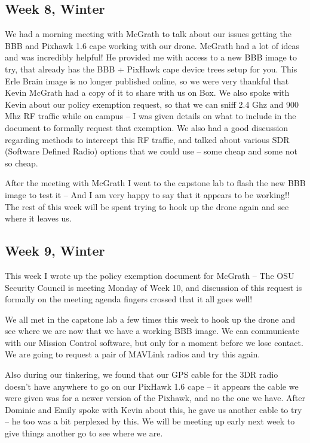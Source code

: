 \documentclass[IEEEtran,letterpaper,10pt,notitlepage,draftclsnofoot,onecolumn]{article}
\begin{document}
\subsection{Week 8, Winter}
We had a morning meeting with McGrath to talk about our issues getting the BBB and Pixhawk 1.6 cape working with our drone. McGrath had a lot of ideas and was incredibly helpful! He provided me with access to a new BBB image to try, that already has the BBB + PixHawk cape device trees setup for you. This Erle Brain image is no longer published online, so we were very thankful that Kevin McGrath had a copy of it to share with us on Box. We also spoke with Kevin about our policy exemption request, so that we can sniff 2.4 Ghz and 900 Mhz RF traffic while on campus -- I was given details on what to include in the document to formally request that exemption. We also had a good discussion regarding methods to intercept this RF traffic, and talked about various SDR (Software Defined Radio) options that we could use -- some cheap and some not so cheap.

After the meeting with McGrath I went to the capstone lab to flash the new BBB image to test it -- And I am very happy to say that it appears to be working!! The rest of this week will be spent trying to hook up the drone again and see where it leaves us.
\subsection{Week 9, Winter}
This week I wrote up the policy exemption document for McGrath -- The OSU Security Council is meeting Monday of Week 10, and discussion of this request is formally on the meeting agenda fingers crossed that it all goes well!

We all met in the capstone lab a few times this week to hook up the drone and see where we are now that we have a working BBB image. We can communicate with our Mission Control software, but only for a moment before we lose contact. We are going to request a pair of MAVLink radios and try this again.

Also during our tinkering, we found that our GPS cable for the 3DR radio doesn't have anywhere to go on our PixHawk 1.6 cape -- it appears the cable we were given was for a newer version of the Pixhawk, and no the one we have. After Dominic and Emily spoke with Kevin about this, he gave us another cable to try -- he too was a bit perplexed by this. We will be meeting up early next week to give things another go to see where we are.
\end{document}
